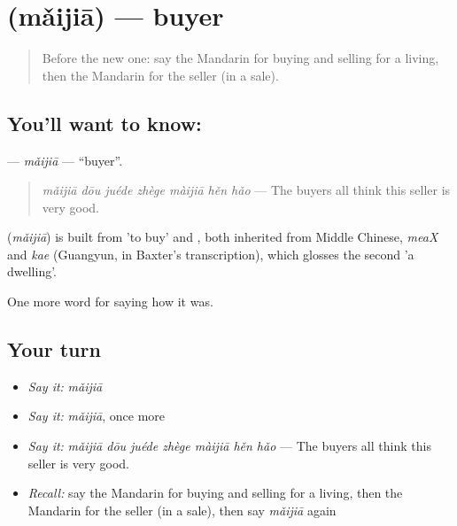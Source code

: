 \section[\texorpdfstring{\zh{买家} (mǎijiā)}{买家 (mǎijiā)}]{ (mǎijiā) — buyer}

\label{lesson:ZH-C523-maijia-buyer}



\begin{quote}
Before the new one: say the Mandarin for buying and selling for a living, then the Mandarin for the seller (in a sale).
\end{quote}

\subsection*{You'll want to know: }
\textbf{} — \emph{mǎijiā} — \textquotedblleft{}buyer\textquotedblright{}.

\begin{quote}
\textbf{} \emph{mǎijiā dōu juéde zhège màijiā hěn hǎo} — The buyers all think this seller is very good.
\end{quote}

\begin{cousinweb}
\textbf{} (\emph{mǎijiā}) is built from  'to buy' and , both inherited from Middle Chinese, \emph{meaX} and \emph{kae} (Guangyun, in Baxter's transcription), which glosses the second 'a dwelling'.
\end{cousinweb}

\begin{grammarlens}[title={What you've built}]
One more word for saying how it was.
\end{grammarlens}

\subsection*{Your turn}
\begin{itemize}
\raggedright
  \item \emph{Say it:} \emph{mǎijiā}
  \item \emph{Say it:} \emph{mǎijiā}, once more
  \item \emph{Say it:} \emph{mǎijiā dōu juéde zhège màijiā hěn hǎo} — The buyers all think this seller is very good.
  \item \emph{Recall:} say the Mandarin for buying and selling for a living, then the Mandarin for the seller (in a sale), then say \emph{mǎijiā} again
\end{itemize}

